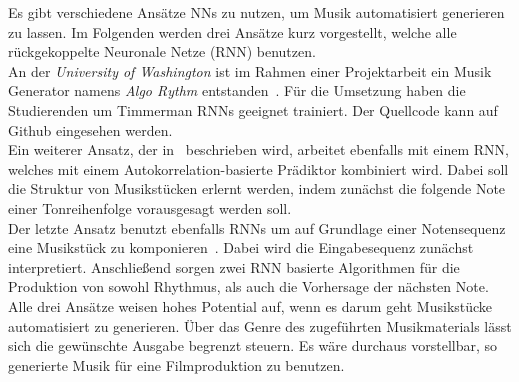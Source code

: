 \documentclass[times, 11pt,twocolumn]{article}
\begin{document}
 \label{sec:SOTAProduktion}
Es gibt verschiedene Ansätze NNs zu nutzen, um Musik automatisiert generieren zu lassen. Im Folgenden werden drei Ansätze kurz vorgestellt, welche alle rückgekoppelte Neuronale Netze (RNN) benutzen. \\
An der \textit{University of Washington} ist im Rahmen einer Projektarbeit ein Musik Generator namens \textit{Algo Rythm} entstanden~\cite{Algorithm}. Für die Umsetzung haben die Studierenden um Timmerman RNNs geeignet trainiert. Der Quellcode kann auf Github \cite{AlgorithmGit} eingesehen werden.\\
Ein weiterer Ansatz, der in~\cite{eck+lapalme:2008} beschrieben wird, arbeitet ebenfalls mit einem RNN, welches mit einem Autokorrelation-basierte Prädiktor kombiniert wird. Dabei soll die Struktur von Musikstücken erlernt werden, indem zunächst die folgende Note einer Tonreihenfolge vorausgesagt werden soll. \\
Der letzte Ansatz benutzt ebenfalls RNNs um auf Grundlage einer Notensequenz eine Musikstück zu komponieren~\cite{browne2001system}. Dabei wird die Eingabesequenz zunächst interpretiert. Anschließend sorgen zwei RNN basierte Algorithmen für die Produktion von sowohl Rhythmus, als auch die Vorhersage der nächsten Note. \\

Alle drei Ansätze weisen hohes Potential auf, wenn es darum geht Musikstücke automatisiert zu generieren. Über das Genre des zugeführten Musikmaterials lässt sich die gewünschte Ausgabe begrenzt steuern. Es wäre durchaus vorstellbar, so generierte Musik für eine Filmproduktion zu benutzen.
\end{document}
